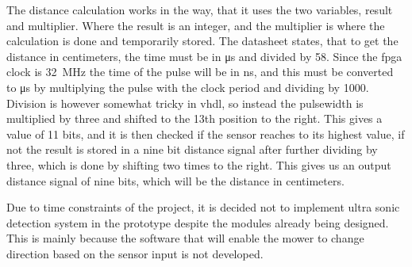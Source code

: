 The distance calculation works in the way, that it uses the two variables, result and multiplier. Where the result is an integer, and the multiplier is where the calculation is done and temporarily stored. The datasheet states, that to get the distance in centimeters, the time must be in \si{\micro\second} and divided by 58. Since the \gls{fpga} clock is \SI{32}{\mega\hertz} the time of the pulse will be in \si{\nano\second}, and this must be converted to \si{\micro\second} by multiplying the pulse with the clock period and dividing by 1000. Division is however somewhat tricky in \gls{vhdl}, so instead the pulsewidth is multiplied by three and shifted to the 13th position to the right. This gives a value of 11 bits, and it is then checked if the sensor reaches to its highest value, if not the result is stored in a nine bit distance signal after further dividing by three, which is done by shifting two times to the right. This gives us an output distance signal of nine bits, which will be the distance in centimeters. 

Due to time constraints of the project, it is decided not to implement  ultra sonic detection system in the prototype despite the modules already being designed. This is mainly because the software that will enable the mower to change direction based on the sensor input is not developed. 